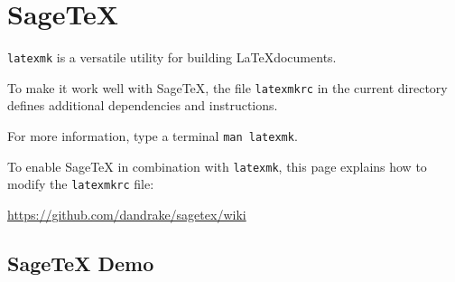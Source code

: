 \documentclass[master.tex]{subfiles}
\begin{document}
\chapter{SageTeX}
\label{sec:sagetex}


\texttt{latexmk} is a versatile utility for building \LaTeX documents.

To make it work well with SageTeX,
the file \texttt{latexmkrc} in the current directory defines
additional dependencies and instructions.

For more information, type a terminal \texttt{man latexmk}.

To enable SageTeX in combination with \texttt{latexmk},
this page explains how to modify the \texttt{latexmkrc} file:

\url{https://github.com/dandrake/sagetex/wiki}

\section{SageTeX Demo}


\end{document}
